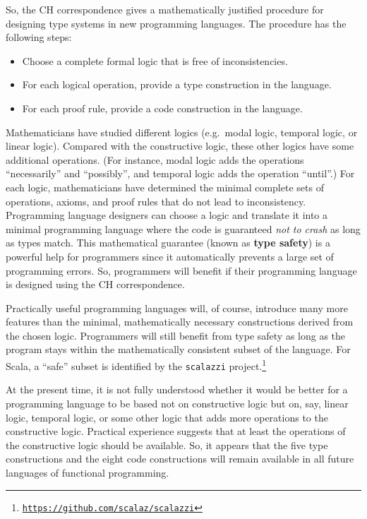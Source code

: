So, the CH correspondence gives a mathematically justified procedure
for designing type systems in new programming languages. The procedure
has the following steps:
\begin{itemize}
\item Choose a complete formal logic that is free of inconsistencies.
\item For each logical operation, provide a type construction in the language.
\item For each proof rule, provide a code construction in the language.
\end{itemize}
Mathematicians have studied different logics (e.g.~modal logic, temporal
logic, or linear logic). Compared with the constructive logic, these
other logics have some additional operations. (For instance, modal
logic adds the operations ``necessarily'' and ``possibly'', and
temporal logic adds the operation ``until''.) For each logic, mathematicians
have determined the minimal complete sets of operations, axioms, and
proof rules that do not lead to inconsistency. Programming language
designers can choose a logic and translate it into a minimal programming
language where the code is guaranteed \emph{not to crash} as long
as types match. This mathematical guarantee (known as \textbf{type
safety}) is a powerful help for programmers since it automatically
prevents a large set of programming errors. So, programmers will benefit
if their programming language is designed using the CH correspondence.

Practically useful programming languages will, of course, introduce
many more features than the minimal, mathematically necessary constructions
derived from the chosen logic. Programmers will still benefit from
type safety as long as the program stays within the mathematically
consistent subset of the language. For Scala, a ``safe'' subset
is identified by the \texttt{scalazzi} project.\footnote{\texttt{\href{https://github.com/scalaz/scalazzi}{https://github.com/scalaz/scalazzi}}}

At the present time, it is not fully understood whether it would be
better for a programming language to be based not on constructive
logic but on, say, linear logic, temporal logic, or some other logic
that adds more operations to the constructive logic. Practical experience
suggests that at least the operations of the constructive logic should
be available. So, it appears that the five type constructions and
the eight code constructions will remain available in all future languages
of functional programming. 

